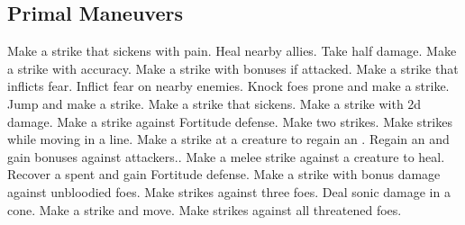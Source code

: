 
\small
\subsection{Primal Maneuvers}\label{Primal Maneuvers}
\begin{spelllist}
 Make a strike that sickens with pain.
 Heal nearby allies.
 Take half damage.
 Make a strike with  accuracy.
 Make a strike with bonuses if attacked.
 Make a strike that inflicts fear.
 Inflict fear on nearby enemies.
 Knock foes prone and make a strike.
 Jump and make a strike.
 Make a strike that sickens.
 Make a strike with \plus2d damage.
 Make a strike against Fortitude defense.
 Make two strikes.
 Make strikes while moving in a line.
 Make a strike at a creature to regain an .
 Regain an  and gain bonuses against attackers..
 Make a melee strike against a creature to heal.
 Recover a spent  and gain  Fortitude defense.
 Make a strike with bonus damage against unbloodied foes.
 Make strikes against three foes.
 Deal sonic damage in a cone.
 Make a strike and move.
 Make strikes against all threatened foes.
\end{spelllist}



\small
